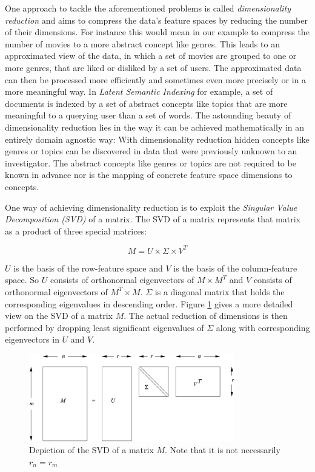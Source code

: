 One approach to tackle the aforementioned problems is called \textsl{dimensionality reduction} and aims to compress the data's feature spaces by reducing the number of their dimensions. For instance this would mean in our example to compress the number of movies to a more abstract concept like genres. This leads to an approximated view of the data, in which a set of movies are grouped to one or more genres, that are liked or disliked by a set of users. The approximated data can then be processed more efficiently and sometimes even more precisely or in a more meaningful way. In \textsl{Latent Semantic Indexing} for example, a set of documents is indexed by a set of abstract concepts like topics that are more meaningful to a querying user than a set of words. The astounding beauty of dimensionality reduction lies in the way it can be achieved mathematically in an entirely domain agnostic way: With dimensionality reduction hidden concepts like genres or topics can be discovered in data that were previously unknown to an investigator. The abstract concepts like genres or topics are not required to be known in advance nor is the mapping of concrete feature space dimensions to concepts.

One way of achieving dimensionality reduction is to exploit the \textsl{Singular Value Decomposition (SVD)} of a matrix. The SVD of a matrix represents that matrix as a product of three special matrices:

\begin{equation}
	M = U \times \Sigma \times V^T
\end{equation}

$U$ is the basis of the row-feature space and $V$ is the basis of the column-feature space. So $U$ consists of orthonormal eigenvectors of $M\times M^T$ and $V$ consists of orthonormal eigenvectors of $M^T\times M$. $\Sigma$ is a diagonal matrix that holds the corresponding eigenvalues in descending order. Figure \ref{fig:svd} gives a more detailed view on the SVD of a matrix $M$. The actual reduction of dimensions is then performed by dropping least significant eigenvalues of $\Sigma$ along with corresponding eigenvectors in $U$ and $V$.
\begin{figure}[h]
	\centering
	\includegraphics[width=0.8\textwidth]{images/svd_mmds.png}
	\caption{Depiction of the SVD of a matrix $M$. Note that it is not necessarily $r_n = r_m$}
	\label{fig:svd}
\end{figure}

